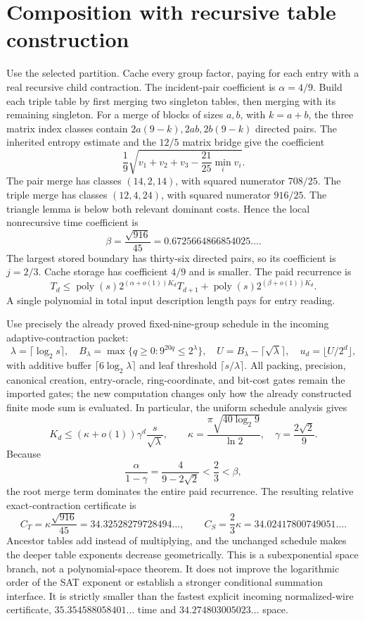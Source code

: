 \section{Composition with recursive table construction}
Use the selected partition. Cache every group factor, paying for each entry
with a real recursive child contraction. The incident-pair coefficient is
$\alpha=4/9$. Build each triple table by first merging two singleton tables,
then merging with its remaining singleton. For a merge of blocks of sizes
$a,b$, with $k=a+b$, the three matrix index classes contain
$2a(9-k),2ab,2b(9-k)$ directed pairs. The inherited entropy estimate and the
$12/5$ matrix bridge give the coefficient
\[
 \frac1{9}\sqrt{v_1+v_2+v_3-\frac{21}{25}\min_i v_i}.
\]
The pair merge has classes $(14,2,14)$, with squared numerator $708/25$.
The triple merge has classes $(12,4,24)$, with squared numerator $916/25$.
The triangle lemma is below both relevant dominant costs. Hence the local
nonrecursive time coefficient is
\[
 \beta=\frac{\sqrt{916}}{45}=0.6725664866854025\ldots.
\]
The largest stored boundary has thirty-six directed pairs, so its coefficient
is $j=2/3$. Cache storage has coefficient $4/9$ and is smaller.
The paid recurrence is
\[
 T_d\le\operatorname{poly}(s)2^{(\alpha+o(1))K_d}T_{d+1}
      +\operatorname{poly}(s)2^{(\beta+o(1))K_d}.
\]
A single polynomial in total input description length pays for entry reading.

Use precisely the already proved fixed-nine-group schedule in the incoming
adaptive-contraction packet:
\[
 \lambda=\lceil\log_2s\rceil,
 \quad B_\lambda=\max\{q\ge0:9^{20q}\le2^\lambda\},
 \quad U=B_\lambda-\lceil\sqrt\lambda\rceil,
 \quad u_d=\lfloor U/2^d\rfloor,
\]
with additive buffer $\lceil6\log_2\lambda\rceil$ and leaf threshold
$\lceil s/\lambda\rceil$. All packing, precision, canonical creation,
entry-oracle, ring-coordinate, and bit-cost gates remain the imported gates;
the new computation changes only how the already constructed finite mode
sum is evaluated. In particular, the uniform schedule analysis gives
\[
 K_d\le(\kappa+o(1))\gamma^d\frac{s}{\sqrt\lambda},
 \qquad
 \kappa=\frac{\pi\sqrt{40\log_2 9}}{\ln2},
 \quad\gamma=\frac{2\sqrt2}{9}.
\]
Because
\[
 \frac\alpha{1-\gamma}=\frac4{9-2\sqrt2}<\frac23<\beta,
\]
the root merge term dominates the entire paid recurrence. The resulting
relative exact-contraction certificate is
\[
 C_T=\kappa\frac{\sqrt{916}}{45}
     =34.32528279728494\ldots,
 \qquad
 C_S=\frac23\kappa=34.02417800749051\ldots.
\]
Ancestor tables add instead of multiplying, and the unchanged schedule makes
the deeper table exponents decrease geometrically. This is a subexponential
space branch, not a polynomial-space theorem. It does not improve the
logarithmic order of the SAT exponent or establish a stronger conditional
summation interface. It is strictly smaller than the fastest explicit
incoming normalized-wire certificate, $35.354588058401\ldots$ time and
$34.274803005023\ldots$ space.
